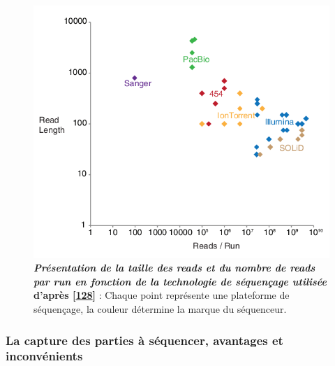 \documentclass[12pt,a4paper,twoside]{ugathesis}
\theoremstyle{definition}
\theoremstyle{definition}
\theoremstyle{definition}
\theoremstyle{remark}
\begin{document}
\begin{figure}

{\centering \includegraphics[scale=.55]{figure/read_per_run} 

}

\caption[Présentation de la taille des reads et du nombre de reads par run en fonction de la technologie de séquençage utilisée]{\textbf{\emph{Présentation de la taille des reads
et du nombre de reads par run en fonction de la technologie de
séquençage utilisée} d'après
{[}\protect\hyperlink{ref-Hodkinson2015}{128}{]}} : Chaque point
représente une plateforme de séquençage, la couleur détermine la marque
du séquenceur.}\label{fig:pictreadPerRun}
\end{figure}








\subsubsection{La capture des parties à séquencer, avantages et
inconvénients}\label{la-capture-des-parties-a-sequencer-avantages-et-inconvenients}
\end{document}
